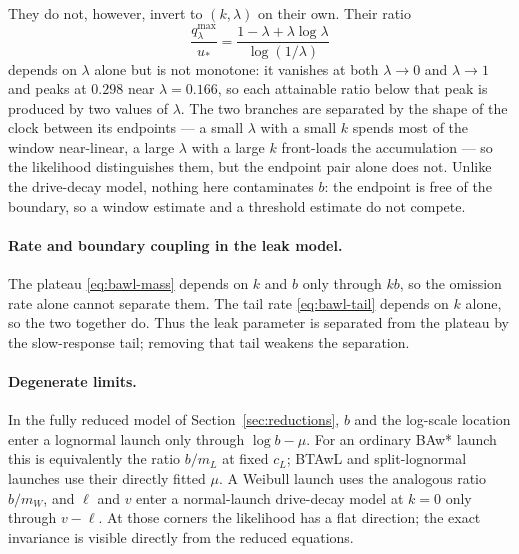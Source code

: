 \documentclass[12pt]{article}
\theoremstyle{remark}
\begin{document}
They do not, however, invert to $(k,\lambda)$ on their own. Their ratio
\begin{equation}
  \frac{q_{\lambda}^{\max}}{u_{*}}
  = \frac{1 - \lambda + \lambda\log\lambda}{\log(1/\lambda)}
\end{equation}
depends on $\lambda$ alone but is not monotone: it vanishes at both $\lambda \to 0$ and $\lambda \to 1$ and peaks at $0.298$ near $\lambda = 0.166$, so each attainable ratio below that peak is produced by two values of $\lambda$. The two branches are separated by the shape of the clock between its endpoints --- a small $\lambda$ with a small $k$ spends most of the window near-linear, a large $\lambda$ with a large $k$ front-loads the accumulation --- so the likelihood distinguishes them, but the endpoint pair alone does not. Unlike the drive-decay model, nothing here contaminates $b$: the endpoint is free of the boundary, so a window estimate and a threshold estimate do not compete.

\paragraph{Rate and boundary coupling in the leak model.} The plateau
\eqref{eq:bawl-mass} depends on $k$ and $b$ only through $kb$, so the omission
rate alone cannot separate them. The tail rate \eqref{eq:bawl-tail} depends on $k$ alone, so the two together do. Thus the leak parameter is separated from the plateau by the slow-response tail; removing that tail weakens the separation.

\paragraph{Degenerate limits.} In the fully reduced model of
Section~\ref{sec:reductions}, $b$ and the log-scale location enter a lognormal launch only through $\log b - \mu$. For an ordinary BAw* launch this is equivalently the ratio $b/m_L$ at fixed $c_L$; BTAwL and split-lognormal launches use their directly fitted $\mu$. A Weibull launch uses the analogous ratio $b/m_W$, and $\ell$ and $v$ enter a normal-launch drive-decay model at $k=0$ only through $v - \ell$. At those corners the likelihood has a flat direction; the exact invariance is visible directly from the reduced equations.

\end{document}
